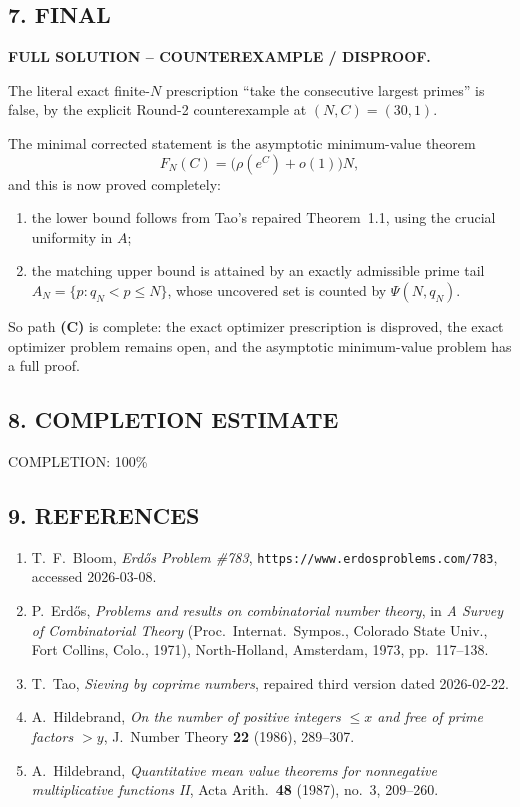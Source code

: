 \subsection*{7. FINAL}

\textbf{FULL SOLUTION -- COUNTEREXAMPLE / DISPROOF.}

The literal exact finite-\(N\) prescription ``take the consecutive largest primes'' is false, by the explicit Round-2 counterexample at \((N,C)=(30,1)\).

The minimal corrected statement is the asymptotic minimum-value theorem
\[
F_N(C)=\bigl(\rho(e^C)+o(1)\bigr)N,
\]
and this is now proved completely:

\begin{enumerate}
    \item the lower bound follows from Tao's repaired Theorem~1.1, using the crucial uniformity in \(A\);
    \item the matching upper bound is attained by an exactly admissible prime tail \(A_N=\{p: q_N<p\le N\}\), whose uncovered set is counted by \(\Psi(N,q_N)\).
\end{enumerate}

So path \textbf{(C)} is complete: the exact optimizer prescription is disproved, the exact optimizer problem remains open, and the asymptotic minimum-value problem has a full proof.

\subsection*{8. COMPLETION ESTIMATE}

COMPLETION: 100\%

\subsection*{9. REFERENCES}

\begin{enumerate}
    \item[\textbf{[EP783]}] T.~F.~Bloom, \emph{Erd\H{o}s Problem \#783}, \texttt{https://www.erdosproblems.com/783}, accessed 2026-03-08.
    \item[\textbf{[Er73]}] P.~Erd\H{o}s, \emph{Problems and results on combinatorial number theory}, in \emph{A Survey of Combinatorial Theory} (Proc.\ Internat.\ Sympos., Colorado State Univ., Fort Collins, Colo., 1971), North-Holland, Amsterdam, 1973, pp.~117--138.
    \item[\textbf{[Tao26]}] T.~Tao, \emph{Sieving by coprime numbers}, repaired third version dated 2026-02-22.
    \item[\textbf{[Hi86]}] A.~Hildebrand, \emph{On the number of positive integers \(\le x\) and free of prime factors \(>y\)}, J.~Number Theory \textbf{22} (1986), 289--307.
    \item[\textbf{[Hi87]}] A.~Hildebrand, \emph{Quantitative mean value theorems for nonnegative multiplicative functions II}, Acta Arith.\ \textbf{48} (1987), no.~3, 209--260.
\end{enumerate}
